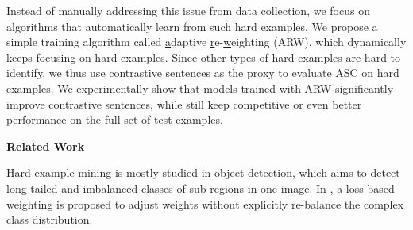 Instead of manually addressing this issue from data collection, we focus on algorithms that automatically learn from such hard examples. 
We propose a simple training algorithm called \underline{a}daptive \underline{r}e-\underline{w}eighting (ARW), which dynamically keeps focusing on hard examples.
Since other types of hard examples are hard to identify, we thus use contrastive sentences as the proxy to evaluate ASC on hard examples.
We experimentally show that models trained with ARW significantly improve contrastive sentences, while still keep competitive or even better performance on the full set of test examples.

\textbf{Related Work}

Hard example mining is mostly studied in object detection\cite{shrivastava2016training,lin2017focal}, which aims to detect long-tailed and imbalanced classes of sub-regions in one image.
In \cite{lin2017focal}, a loss-based weighting is proposed to adjust weights without explicitly re-balance the complex class distribution. 

